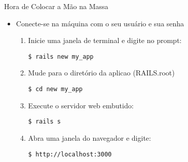 \begin{frame}[fragile,t]{Hora de Colocar a Mão na Massa}
	\begin{itemize}
		\item Conecte-se na máquina com o seu usuário e sua senha
		\begin{enumerate}
	    \item Inicie uma janela de terminal e digite no prompt:
	     \begin{lstlisting}[style=BashInputBasicStyle]
	     $ rails new my_app
	     \end{lstlisting}

	    \item Mude para o diretório da aplicao (RAILS.root)
	     \begin{lstlisting}[style=BashInputBasicStyle]
	     $ cd new my_app
	     \end{lstlisting}
    
	    \item Execute o servidor web embutido:
	    \begin{lstlisting}[style=BashInputBasicStyle]
	    $ rails s
	    \end{lstlisting}
	    
	    \item Abra uma janela do navegador e digite:
	     \begin{lstlisting}[style=BashInputBasicStyle]
	     $ http://localhost:3000
	     \end{lstlisting}
	  \end{enumerate}
	\end{itemize}
\end{frame}